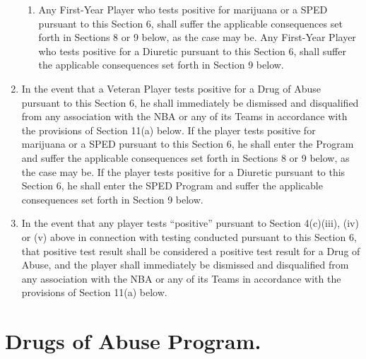 \documentclass[
]{book}
\begin{document}
\begin{enumerate}
\begin{enumerate}
  \item
    Any First-Year Player who tests positive for marijuana or a SPED pursuant to this Section 6, shall suffer the applicable consequences set forth in Sections 8 or 9 below, as the case may be. Any First-Year Player who tests positive for a Diuretic pursuant to this Section 6, shall suffer the applicable consequences set forth in Section 9 below.
  \end{enumerate}
\item
  In the event that a Veteran Player tests positive for a Drug of Abuse pursuant to this Section 6, he shall immediately be dismissed and disqualified from any association with the NBA or any of its Teams in accordance with the provisions of Section 11(a) below. If the player tests positive for marijuana or a SPED pursuant to this Section 6, he shall enter the Program and suffer the applicable consequences set forth in Sections 8 or 9 below, as the case may be. If the player tests positive for a Diuretic pursuant to this Section 6, he shall enter the SPED Program and suffer the applicable consequences set forth in Section 9 below.
\item
  In the event that any player tests ``positive'' pursuant to Section 4(c)(iii), (iv) or (v) above in connection with testing conducted pursuant to this Section 6, that positive test result shall be considered a positive test result for a Drug of Abuse, and the player shall immediately be dismissed and disqualified from any association with the NBA or any of its Teams in accordance with the provisions of Section 11(a) below.
\end{enumerate}

\hypertarget{drugs-of-abuse-program.}{%
\section{Drugs of Abuse Program.}\label{drugs-of-abuse-program.}}
\end{document}
